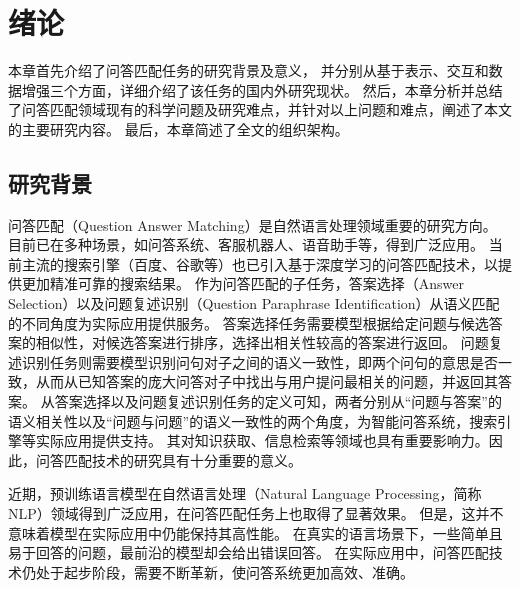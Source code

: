 \chapter{绪论}

本章首先介绍了问答匹配任务的研究背景及意义，
并分别从基于表示、交互和数据增强三个方面，详细介绍了该任务的国内外研究现状。
然后，本章分析并总结了问答匹配领域现有的科学问题及研究难点，并针对以上问题和难点，阐述了本文的主要研究内容。
最后，本章简述了全文的组织架构。

\section{研究背景}


问答匹配（Question Answer Matching）是自然语言处理领域重要的研究方向。
目前已在多种场景，如问答系统、客服机器人、语音助手等，得到广泛应用。
当前主流的搜索引擎（百度、谷歌等）也已引入基于深度学习的问答匹配技术，以提供更加精准可靠的搜索结果。
作为问答匹配的子任务，答案选择（Answer Selection）以及问题复述识别（Question Paraphrase Identification）从语义匹配的不同角度为实际应用提供服务。
答案选择任务需要模型根据给定问题与候选答案的相似性，对候选答案进行排序，选择出相关性较高的答案进行返回。
问题复述识别任务则需要模型识别问句对子之间的语义一致性，即两个问句的意思是否一致，从而从已知答案的庞大问答对子中找出与用户提问最相关的问题，并返回其答案。
从答案选择以及问题复述识别任务的定义可知，两者分别从“问题与答案”的语义相关性以及“问题与问题”的语义一致性的两个角度，为智能问答系统，搜索引擎等实际应用提供支持。
其对知识获取、信息检索等领域也具有重要影响力。因此，问答匹配技术的研究具有十分重要的意义。

近期，预训练语言模型在自然语言处理（Natural Language Processing，简称NLP）领域得到广泛应用，在问答匹配任务上也取得了显著效果。
但是，这并不意味着模型在实际应用中仍能保持其高性能。
在真实的语言场景下，一些简单且易于回答的问题，最前沿的模型却会给出错误回答。
在实际应用中，问答匹配技术仍处于起步阶段，需要不断革新，使问答系统更加高效、准确。

